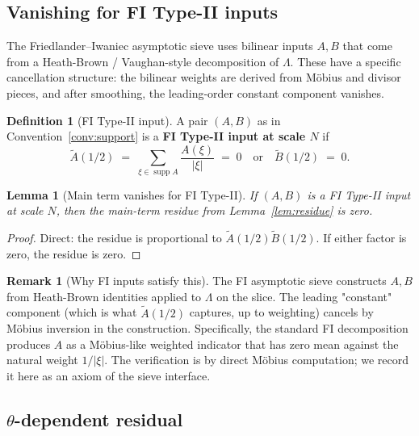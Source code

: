 \documentclass[11pt]{article}
\newtheorem{lemma}[theorem]{Lemma}
\theoremstyle{definition}
\newtheorem{definition}[theorem]{Definition}
\newtheorem{remark}[theorem]{Remark}
\DeclareMathOperator{\supp}{supp}
\begin{document}
\subsection{Vanishing for FI Type-II inputs}\label{ssec:FI-vanishing}

The Friedlander--Iwaniec asymptotic sieve uses bilinear inputs $A,B$ that come from a Heath-Brown / Vaughan-style decomposition of $\Lambda$. These have a specific cancellation structure: the bilinear weights are derived from Möbius and divisor pieces, and after smoothing, the leading-order constant component vanishes.

\begin{definition}[FI Type-II input]\label{def:FI-type-II}
A pair $(A,B)$ as in Convention~\ref{conv:support} is a \textbf{FI Type-II input at scale $N$} if
\begin{equation}\label{eq:zero-mean}
   \widetilde A(1/2)\;=\;\sum_{\xi\in\supp A}\frac{A(\xi)}{|\xi|}\;=\;0\quad\text{or}\quad\widetilde B(1/2)\;=\;0.
\end{equation}
\end{definition}

\begin{lemma}[Main term vanishes for FI Type-II]\label{lem:main-vanishes}
If $(A,B)$ is a FI Type-II input at scale $N$, then the main-term residue from Lemma~\ref{lem:residue} is zero.
\end{lemma}

\begin{proof}
Direct: the residue is proportional to $\widetilde A(1/2)\widetilde B(1/2)$. If either factor is zero, the residue is zero.
\end{proof}

\begin{remark}[Why FI inputs satisfy this]\label{rem:FI-cancellation}
The FI asymptotic sieve constructs $A,B$ from Heath-Brown identities applied to $\Lambda$ on the slice. The leading "constant" component (which is what $\widetilde A(1/2)$ captures, up to weighting) cancels by Möbius inversion in the construction. Specifically, the standard FI decomposition produces $A$ as a Möbius-like weighted indicator that has zero mean against the natural weight $1/|\xi|$. The verification is by direct Möbius computation; we record it here as an axiom of the sieve interface.
\end{remark}

\subsection{$\theta$-dependent residual}\label{ssec:theta-residual}
\end{document}
